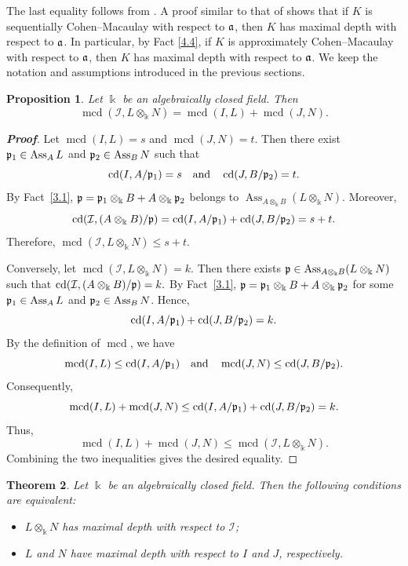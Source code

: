 \documentclass[10pt,a4paper]{amsart}
\newtheorem{theorem}{Theorem}[section]
\numberwithin{equation}{theorem}
\newtheorem{proposition}[theorem]{Proposition}
\theoremstyle{definition}
\theoremstyle{fact}
\theoremstyle{conjecture}
\newcommand{\Ass}{\operatorname{Ass}}
\newcommand{\cd}{\operatorname{cd}}
\newcommand{\mcd}{\operatorname{mcd}}
\newcommand{\fp}{\frak{p}}
\newcommand{\fa}{\frak{a}}
\newenvironment{prf}[1][Proof]{\begin{proof}[\bf #1]}{\end{proof}}
\begin{document}
The last equality follows from \cite[Corollary~4.6]{CJR}.
A proof similar to that of \cite[Proposition 1.6]{R3} shows that if $K$ is sequentially Cohen--Macaulay with respect to $\fa$,
 then $K$ has maximal depth with respect to $\fa$. In particular, by Fact \ref{4.4}, if $K$ is approximately Cohen--Macaulay
  with respect to $\fa$, then $K$ has maximal depth with respect to $\fa$.
 We keep the notation and assumptions introduced in the previous sections.
\begin{proposition}
\label{5.1} Let $\Bbbk$ be an algebraically closed field. Then
\[
\mcd(\mathcal{I}, L\otimes_\Bbbk N)
=
\mcd(I,L)+\mcd(J,N).
\]
\end{proposition}
\begin{prf}
Let $\mcd(I,L)=s$ and $\mcd(J,N)=t$. Then there exist
$\fp_1\in\Ass_A L$ and $\fp_2\in\Ass_B N$ such that
\[
\cd(I,A/\fp_1)=s
\quad\text{and}\quad
\cd(J,B/\fp_2)=t.
\]
By Fact~\ref{3.1},
$
\fp=\fp_1\otimes_\Bbbk B+A\otimes_\Bbbk\fp_2
$
belongs to $\Ass_{A\otimes_\Bbbk B}(L\otimes_\Bbbk N)$. Moreover,
\[
\cd(\mathcal{I},(A\otimes_\Bbbk B)/\fp)
=
\cd(I,A/\fp_1)+\cd(J,B/\fp_2)
=s+t.
\]
Therefore,
$
\mcd(\mathcal{I},L\otimes_\Bbbk N)\leq s+t.
$

Conversely, let
$
\mcd(\mathcal{I},L\otimes_\Bbbk N)=k.
$
Then there exists
$\fp\in\Ass_{A\otimes_\Bbbk B}(L\otimes_\Bbbk N)$ such that
$
\cd(\mathcal{I},(A\otimes_\Bbbk B)/\fp)=k.
$
By Fact~\ref{3.1}, $\fp=\fp_1\otimes_\Bbbk B+A\otimes_\Bbbk\fp_2$ for some $\fp_1\in\Ass_A L$ and $\fp_2\in\Ass_B N$. Hence,
\[
\cd(I,A/\fp_1)+\cd(J,B/\fp_2)=k.
\]
By the definition of $\mcd$, we have
\[
\mcd(I,L)\leq\cd(I,A/\fp_1)
\quad\text{and}\quad
\mcd(J,N)\leq\cd(J,B/\fp_2).
\]
Consequently,
\[
\mcd(I,L)+\mcd(J,N)
\leq
\cd(I,A/\fp_1)+\cd(J,B/\fp_2)
=k.
\]
Thus,
\[
\mcd(I,L)+\mcd(J,N)
\leq
\mcd(\mathcal{I},L\otimes_\Bbbk N).
\]
Combining the two inequalities gives the desired equality.
\end{prf}

\begin{theorem}
\label{5.2}
Let $\Bbbk$ be an algebraically closed field. Then the following conditions are equivalent:
\begin{itemize}
\item[(a)] $L\otimes_{\Bbbk} N$ has maximal depth with respect to $\mathcal{I}$;
\item[(b)] $L$ and $N$ have maximal depth with respect to $I$ and $J$, respectively.
\end{itemize}
\end{theorem}
\end{document}
